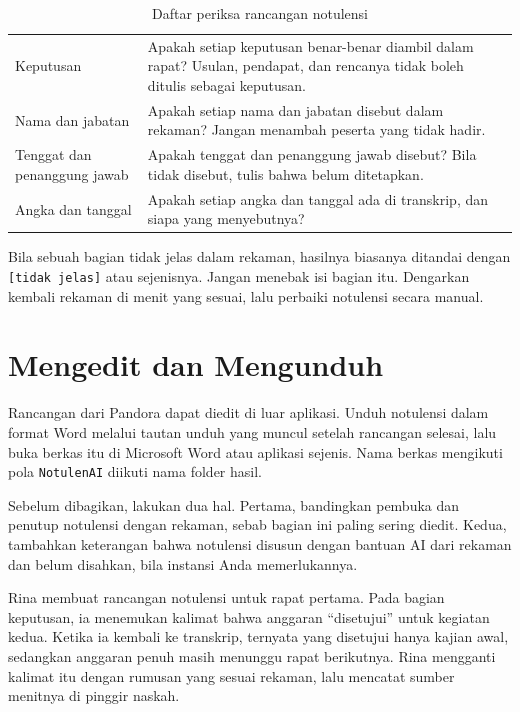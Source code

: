 \begin{table}[H]
\caption{Daftar periksa rancangan notulensi}
\label{tab:periksa}
{\small
\begin{tabularx}{\linewidth}{@{}P{3.6cm}Y@{}}
\toprule
{} &  \\
\midrule
Keputusan & Apakah setiap keputusan benar-benar diambil dalam rapat? Usulan, pendapat, dan rencanya tidak boleh ditulis sebagai keputusan. \\
Nama dan jabatan & Apakah setiap nama dan jabatan disebut dalam rekaman? Jangan menambah peserta yang tidak hadir. \\
Tenggat dan penanggung jawab & Apakah tenggat dan penanggung jawab disebut? Bila tidak disebut, tulis bahwa belum ditetapkan. \\
Angka dan tanggal & Apakah setiap angka dan tanggal ada di transkrip, dan siapa yang menyebutnya? \\
\bottomrule
\end{tabularx}
}
\end{table}

Bila sebuah bagian tidak jelas dalam rekaman, hasilnya biasanya ditandai dengan \texttt{[tidak jelas]} atau sejenisnya. Jangan menebak isi bagian itu. Dengarkan kembali rekaman di menit yang sesuai, lalu perbaiki notulensi secara manual.

\section{Mengedit dan Mengunduh}
Rancangan dari Pandora dapat diedit di luar aplikasi. Unduh notulensi dalam format Word melalui tautan unduh yang muncul setelah rancangan selesai, lalu buka berkas itu di Microsoft Word atau aplikasi sejenis. Nama berkas mengikuti pola \texttt{NotulenAI} diikuti nama folder hasil.

Sebelum dibagikan, lakukan dua hal. Pertama, bandingkan pembuka dan penutup notulensi dengan rekaman, sebab bagian ini paling sering diedit. Kedua, tambahkan keterangan bahwa notulensi disusun dengan bantuan AI dari rekaman dan belum disahkan, bila instansi Anda memerlukannya.

\begin{ilustrasi}
Rina membuat rancangan notulensi untuk rapat pertama. Pada bagian keputusan, ia menemukan kalimat bahwa anggaran ``disetujui'' untuk kegiatan kedua. Ketika ia kembali ke transkrip, ternyata yang disetujui hanya kajian awal, sedangkan anggaran penuh masih menunggu rapat berikutnya. Rina mengganti kalimat itu dengan rumusan yang sesuai rekaman, lalu mencatat sumber menitnya di pinggir naskah.
\end{ilustrasi}

